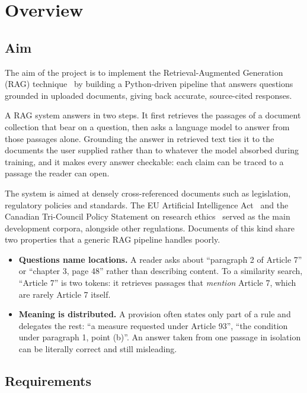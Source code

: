 \section{Overview}
\label{sec:overview}

\subsection{Aim}

The aim of the project is to implement the Retrieval-Augmented Generation
(RAG) technique~\cite{lewis2020rag} by building a Python-driven pipeline that
answers questions grounded in uploaded documents, giving back accurate,
source-cited responses.

A RAG system answers in two steps. It first retrieves the passages of a
document collection that bear on a question, then asks a language model to
answer from those passages alone. Grounding the answer in retrieved text ties
it to the documents the user supplied rather than to whatever the model
absorbed during training, and it makes every answer checkable: each claim can
be traced to a passage the reader can open.

The system is aimed at densely cross-referenced documents such as legislation,
regulatory policies and standards. The EU Artificial Intelligence
Act~\cite{euaiact} and the Canadian Tri-Council Policy Statement on research
ethics~\cite{tcps2} served as the main development corpora, alongside other
regulations. Documents of this kind share two properties that a generic RAG
pipeline handles poorly.

\begin{itemize}
  \item \textbf{Questions name locations.} A reader asks about ``paragraph 2
  of Article 7'' or ``chapter 3, page 48'' rather than describing content.
  To a similarity search, ``Article 7'' is two tokens: it retrieves passages
  that \emph{mention} Article 7, which are rarely Article 7 itself.
  \item \textbf{Meaning is distributed.} A provision often states only part of
  a rule and delegates the rest: ``a measure requested under Article 93'',
  ``the condition under paragraph 1, point (b)''. An answer taken from one
  passage in isolation can be literally correct and still misleading.
\end{itemize}

\subsection{Requirements}

